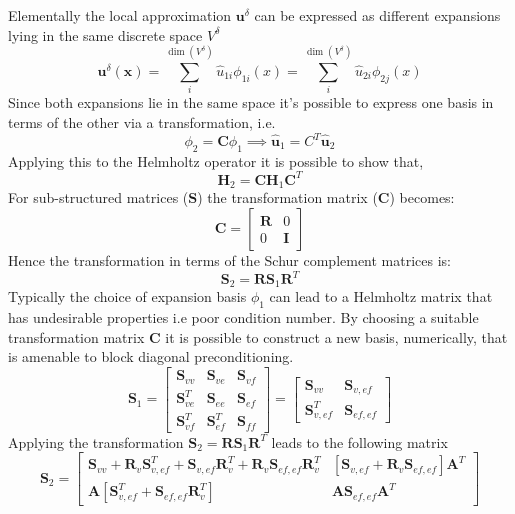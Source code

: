 Elementally the local approximation $\mathbf{u}^{\delta}$ can be expressed as
different expansions lying in the same discrete space $V^{\delta}$
%
\[
\mathbf{u}^{\delta}(\mathbf{x})=\sum_{i}^{\dim(V^{\delta})}\hat{u}_{1i}\phi_{1i}(x)
= \sum_{i}^{\dim(V^{\delta})}\hat{u}_{2i}\phi_{2j}(x)
\]
%
Since both expansions lie in the same space it's possible to express one basis
in terms of the other via a transformation, i.e.
%
\[
\phi_{2}=\mathbf{C}\phi_{1} \implies \hat{\mathbf{u}}_{1}=C^{T}\hat{\mathbf{u}}_{2}
\]
%
Applying this to the Helmholtz operator it is possible to show that,
%
\[
\mathbf{H}_{2}=\mathbf{C}\mathbf{H}_{1}\mathbf{C}^{T}
\]
%
For sub-structured matrices ($\mathbf{S}$) the transformation matrix
($\mathbf{C}$) becomes:
%
\[
\mathbf{C}=\left[ \begin{array}{cc}
\mathbf{R} & 0\\
0 & \mathbf{I}
 \end{array} \right]
\]
%
Hence the transformation in terms of the Schur complement matrices is:
%
\[
\mathbf{S}_{2}=\mathbf{R}\mathbf{S}_{1}\mathbf{R}^{T}
\]
%
Typically the choice of expansion basis $\phi_{1}$ can lead to a Helmholtz
matrix that has undesirable properties i.e poor condition number. By choosing a
suitable transformation matrix $\mathbf{C}$ it is possible to construct a new
basis, numerically, that is amenable to block diagonal preconditioning.
%
\[
\mathbf{S}_{1}=\left[ \begin{array}{ccc}
\mathbf{S}_{vv} & \mathbf{S}_{ve} & \mathbf{S}_{vf}\\
\mathbf{S}^{T}_{ve}& \mathbf{S}_{ee} & \mathbf{S}_{ef} \\
\mathbf{S}^{T}_{vf} & \mathbf{S}^{T}_{ef} & \mathbf{S}_{ff} \end{array} \right] =\left[ \begin{array}{cc}
\mathbf{S}_{vv} & \mathbf{S}_{v,ef} \\
\mathbf{S}^{T}_{v,ef} & \mathbf{S}_{ef,ef} \end{array} \right]
\]
%
Applying the transformation
$\mathbf{S}_{2}=\mathbf{R} \mathbf{S}_{1} \mathbf{R}^{T}$ leads to the following
matrix
%
\[
\mathbf{S}_{2}=\left[ \begin{array}{cc}
\mathbf{S}_{vv}+\mathbf{R}_{v}\mathbf{S}^{T}_{v,ef}+\mathbf{S}_{v,ef}\mathbf{R}^{T}_{v}+\mathbf{R}_{v}\mathbf{S}_{ef,ef}\mathbf{R}^{T}_{v} & [\mathbf{S}_{v,ef}+\mathbf{R}_{v}\mathbf{S}_{ef,ef}]\mathbf{A}^{T} \\
\mathbf{A}[\mathbf{S}^{T}_{v,ef}+\mathbf{S}_{ef,ef}\mathbf{R}^{T}_{v}] & \mathbf{A}\mathbf{S}_{ef,ef}\mathbf{A}^{T} \end{array} \right]
\]
